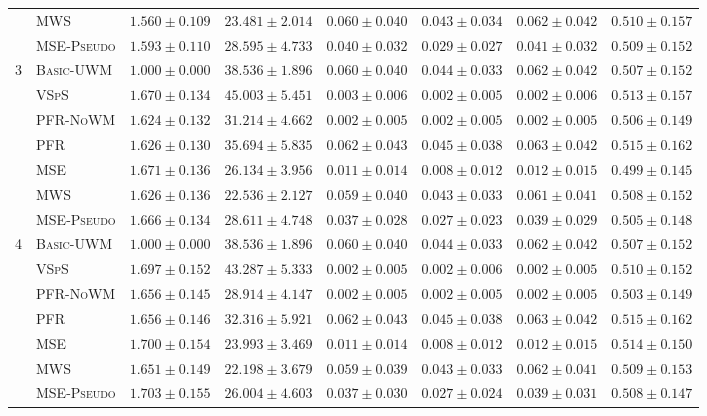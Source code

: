 \begin{table}[!htbp]
{\begin{tabular}{llcccccc}
 & \textsc{MWS} & $1.560 \pm 0.109$ & $23.481 \pm 2.014$ & $0.060 \pm 0.040$ & $0.043 \pm 0.034$ & $0.062 \pm 0.042$ & $0.510 \pm 0.157$ \\
 & \textsc{MSE-Pseudo} & $1.593 \pm 0.110$ & $28.595 \pm 4.733$ & $0.040 \pm 0.032$ & $0.029 \pm 0.027$ & $0.041 \pm 0.032$ & $0.509 \pm 0.152$ \\
\midrule
3 & \textsc{Basic-UWM} & $1.000 \pm 0.000$ & $38.536 \pm 1.896$ & $0.060 \pm 0.040$ & $0.044 \pm 0.033$ & $0.062 \pm 0.042$ & $0.507 \pm 0.152$ \\
 & \textsc{VSpS} & $1.670 \pm 0.134$ & $45.003 \pm 5.451$ & $0.003 \pm 0.006$ & $0.002 \pm 0.005$ & $0.002 \pm 0.006$ & $0.513 \pm 0.157$ \\
 & \textsc{PFR-NoWM} & $1.624 \pm 0.132$ & $31.214 \pm 4.662$ & $0.002 \pm 0.005$ & $0.002 \pm 0.005$ & $0.002 \pm 0.005$ & $0.506 \pm 0.149$ \\
 & \textsc{PFR} & $1.626 \pm 0.130$ & $35.694 \pm 5.835$ & $0.062 \pm 0.043$ & $0.045 \pm 0.038$ & $0.063 \pm 0.042$ & $0.515 \pm 0.162$ \\
 & \textsc{MSE} & $1.671 \pm 0.136$ & $26.134 \pm 3.956$ & $0.011 \pm 0.014$ & $0.008 \pm 0.012$ & $0.012 \pm 0.015$ & $0.499 \pm 0.145$ \\
 & \textsc{MWS} & $1.626 \pm 0.136$ & $22.536 \pm 2.127$ & $0.059 \pm 0.040$ & $0.043 \pm 0.033$ & $0.061 \pm 0.041$ & $0.508 \pm 0.152$ \\
 & \textsc{MSE-Pseudo} & $1.666 \pm 0.134$ & $28.611 \pm 4.748$ & $0.037 \pm 0.028$ & $0.027 \pm 0.023$ & $0.039 \pm 0.029$ & $0.505 \pm 0.148$ \\
\midrule
4 & \textsc{Basic-UWM} & $1.000 \pm 0.000$ & $38.536 \pm 1.896$ & $0.060 \pm 0.040$ & $0.044 \pm 0.033$ & $0.062 \pm 0.042$ & $0.507 \pm 0.152$ \\
 & \textsc{VSpS} & $1.697 \pm 0.152$ & $43.287 \pm 5.333$ & $0.002 \pm 0.005$ & $0.002 \pm 0.006$ & $0.002 \pm 0.005$ & $0.510 \pm 0.152$ \\
 & \textsc{PFR-NoWM} & $1.656 \pm 0.145$ & $28.914 \pm 4.147$ & $0.002 \pm 0.005$ & $0.002 \pm 0.005$ & $0.002 \pm 0.005$ & $0.503 \pm 0.149$ \\
 & \textsc{PFR} & $1.656 \pm 0.146$ & $32.316 \pm 5.921$ & $0.062 \pm 0.043$ & $0.045 \pm 0.038$ & $0.063 \pm 0.042$ & $0.515 \pm 0.162$ \\
 & \textsc{MSE} & $1.700 \pm 0.154$ & $23.993 \pm 3.469$ & $0.011 \pm 0.014$ & $0.008 \pm 0.012$ & $0.012 \pm 0.015$ & $0.514 \pm 0.150$ \\
 & \textsc{MWS} & $1.651 \pm 0.149$ & $22.198 \pm 3.679$ & $0.059 \pm 0.039$ & $0.043 \pm 0.033$ & $0.062 \pm 0.041$ & $0.509 \pm 0.153$ \\
 & \textsc{MSE-Pseudo} & $1.703 \pm 0.155$ & $26.004 \pm 4.603$ & $0.037 \pm 0.030$ & $0.027 \pm 0.024$ & $0.039 \pm 0.031$ & $0.508 \pm 0.147$ \\
\bottomrule
\end{tabular}
}
\end{table}

